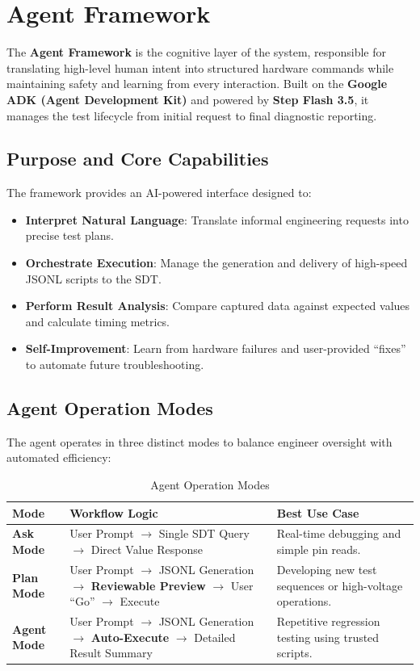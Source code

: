 \documentclass[conference]{IEEEtran}
\begin{document}
\section{Agent Framework}
The \textbf{Agent Framework} is the cognitive layer of the system, responsible for translating high-level human intent into structured hardware commands while maintaining safety and learning from every interaction. Built on the \textbf{Google ADK (Agent Development Kit)} and powered by \textbf{Step Flash 3.5}, it manages the test lifecycle from initial request to final diagnostic reporting.

\subsection{Purpose and Core Capabilities}
The framework provides an AI-powered interface designed to:
\begin{itemize}
    \item \textbf{Interpret Natural Language}: Translate informal engineering requests into precise test plans.
    \item \textbf{Orchestrate Execution}: Manage the generation and delivery of high-speed JSONL scripts to the SDT.
    \item \textbf{Perform Result Analysis}: Compare captured data against expected values and calculate timing metrics.
    \item \textbf{Self-Improvement}: Learn from hardware failures and user-provided ``fixes'' to automate future troubleshooting.
\end{itemize}

\subsection{Agent Operation Modes}
The agent operates in three distinct modes to balance engineer oversight with automated efficiency:

\begin{table}[htbp]
\caption{Agent Operation Modes}
\begin{center}
\begin{tabular}{|p{1.5cm}|p{3.5cm}|p{2.5cm}|}
\hline
\textbf{Mode} & \textbf{Workflow Logic} & \textbf{Best Use Case} \\
\hline
\textbf{Ask Mode} & User Prompt $\rightarrow$ Single SDT Query $\rightarrow$ Direct Value Response & Real-time debugging and simple pin reads. \\
\hline
\textbf{Plan Mode} & User Prompt $\rightarrow$ JSONL Generation $\rightarrow$ \textbf{Reviewable Preview} $\rightarrow$ User ``Go'' $\rightarrow$ Execute & Developing new test sequences or high-voltage operations. \\
\hline
\textbf{Agent Mode} & User Prompt $\rightarrow$ JSONL Generation $\rightarrow$ \textbf{Auto-Execute} $\rightarrow$ Detailed Result Summary & Repetitive regression testing using trusted scripts. \\
\hline
\end{tabular}
\end{center}
\end{table}
\end{document}
